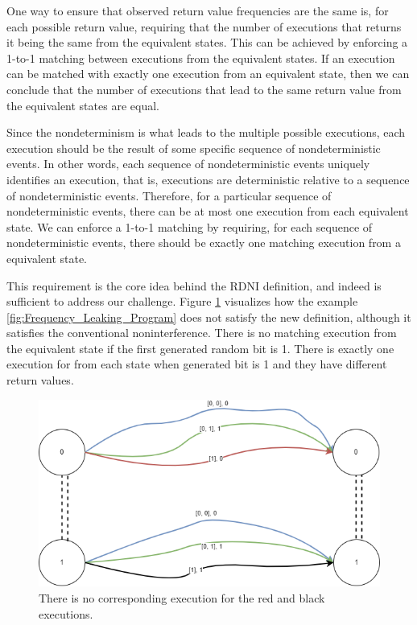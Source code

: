 One way to ensure that observed return value frequencies are the same is, for each possible return value, requiring that the number of executions that returns it being the same from the equivalent states. This can be achieved by enforcing a 1-to-1 matching between executions from the equivalent states. If an execution can be matched with exactly one execution from an equivalent state, then we can conclude that the number of executions that lead to the same return value from the equivalent states are equal.

Since the nondeterminism is what leads to the multiple possible executions, each execution should be the result of some specific sequence of nondeterministic events. In other words, each sequence of nondeterministic events uniquely identifies an execution, that is, executions are deterministic relative to a sequence of nondeterministic events. Therefore, for a particular sequence of nondeterministic events, there can be at most one execution from each equivalent state. We can enforce a 1-to-1 matching by requiring, for each sequence of nondeterministic events, there should be exactly one matching execution from a equivalent state. 

This requirement is the core idea behind the RDNI definition, and indeed is sufficient to address our challenge. Figure \ref{fig:RDNI_Matching_Paths} visualizes how the example \ref{fig:Frequency_Leaking_Program} does not satisfy the new definition, although it satisfies the conventional noninterference. There is no matching execution from the equivalent state if the first generated random bit is 1. There is exactly one execution for from each state when generated bit is 1 and they have different return values.

\begin{figure}[H]
    \centering
    \includegraphics[scale=0.5]{templates/figures/matching-paths-rdni.png}
    \caption{There is no corresponding execution for the red and black executions.}
    \label{fig:RDNI_Matching_Paths}
\end{figure}

